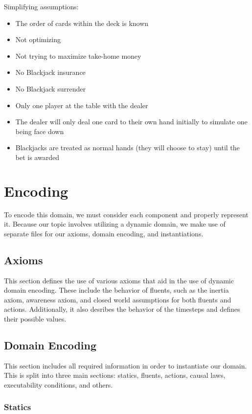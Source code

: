 \documentclass{article}
\begin{document}
Simplifying assumptions:

\begin{itemize}
    \item The order of cards within the deck is known
    \item Not optimizing
    \item Not trying to maximize take-home money
    \item No Blackjack insurance
    \item No Blackjack surrender
    \item Only one player at the table with the dealer
    \item The dealer will only deal one card to their own hand initially to simulate one being face down
    \item Blackjacks are treated as normal hands (they will choose to stay) until the bet is awarded
\end{itemize}

\section{Encoding}

To encode this domain, we must consider each component and properly represent it.
Because our topic involves utilizing a dynamic domain, we make use of separate files for our axioms,
domain encoding, and instantiations.


\subsection{Axioms}

This section defines the use of various axioms that aid in the use of dynamic domain encoding.
These include the behavior of fluents, such as the inertia axiom, awareness axiom, and closed world assumptions for both fluents and actions.
Additionally, it also desribes the behavior of the timesteps and defines their possible values.

\subsection{Domain Encoding}

This section includes all required information in order to instantiate our domain.
This is split into three main sections: statics, fluents, actions, causal laws, executability
conditions, and others.

\subsubsection{Statics}
\end{document}
